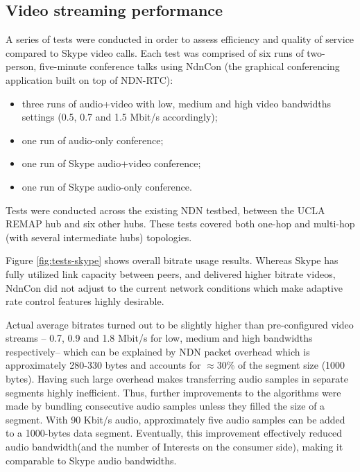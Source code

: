 \documentclass{icn/sig-alternate-2012} %
\newcommand{\ndnrtcName}{NDN-RTC} %
\newcommand{\ndnconName}{NdnCon}
\begin{document}
\subsection{Video streaming performance}
A series of tests were conducted in order to assess efficiency and quality of service compared to Skype video calls. Each test was comprised of six runs of two-person, five-minute conference talks using \ndnconName{} (the graphical conferencing application built on top of \ndnrtcName{}):
\begin{itemize}
\item three runs of audio+video with low, medium and high video bandwidths settings (0.5, 0.7 and 1.5 Mbit/s accordingly);
\item one run of audio-only conference;
\item one run of Skype audio+video conference;
\item one run of Skype audio-only conference.
\end{itemize}

Tests were conducted across the existing NDN testbed, between the UCLA REMAP hub and six other hubs. These tests covered both one-hop and multi-hop (with several intermediate hubs) topologies.

Figure \ref{fig:tests-skype} shows overall bitrate usage results. Whereas Skype has fully utilized link capacity between peers, and delivered higher bitrate videos, NdnCon did not adjust to the current network conditions which make adaptive rate control features highly desirable.

Actual average bitrates turned out to be slightly higher than pre-configured video streams -- 0.7, 0.9 and 1.8 Mbit/s for low, medium and high bandwidths respectively-- which can be explained by NDN packet overhead which is approximately 280-330 bytes and accounts for $\approx$30\% of the segment size (1000 bytes). Having such large overhead makes transferring audio samples in separate segments highly inefficient. Thus, further improvements to the algorithms were made by bundling consecutive audio samples unless they filled the size of a segment. With 90 Kbit/s audio, approximately five audio samples can be added to a 1000-bytes data segment. Eventually, this improvement effectively reduced audio bandwidth(and the number of Interests on the consumer side), making it comparable to Skype audio bandwidths.

\end{document}
